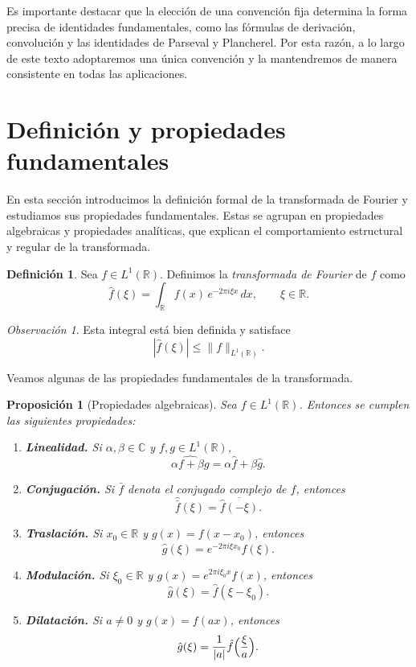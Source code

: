 \documentclass[12pt, a4paper]{amsbook}
\newcommand{\R}{{\mathbb R}}
\newcommand{\C}{{\mathbb C}}
\newtheorem{prop}[teo]{Proposición}
\theoremstyle{remark}
\newtheorem{obs}[teo]{Observación}
\theoremstyle{definition}
\newtheorem{defi}[teo]{Definición}
\numberwithin{section}{chapter}
\numberwithin{subsection}{section}
\numberwithin{equation}{section}
\numberwithin{figure}{chapter}
\begin{document}
Es importante destacar que la elección de una convención fija determina la forma precisa de identidades fundamentales, como las fórmulas de derivación, convolución y las identidades de Parseval y Plancherel. Por esta razón, a lo largo de este texto adoptaremos una única convención y la mantendremos de manera consistente en todas las aplicaciones.

\section{Definición y propiedades fundamentales}

En esta sección introducimos la definición formal de la transformada de Fourier y estudiamos sus propiedades fundamentales. Estas se agrupan en propiedades algebraicas y propiedades analíticas, que explican el comportamiento estructural y regular de la transformada.


\begin{defi}
Sea $f\in L^1(\R)$. Definimos la \emph{transformada de Fourier} de $f$ como
\[
\hat f(\xi)=\int_{\R} f(x)\,e^{-2\pi i \xi x}\,dx,
\qquad \xi\in\R.
\]
\end{defi}

\begin{obs}
Esta integral está bien definida y satisface
\[
|\hat f(\xi)|\le \|f\|_{L^1(\R)}.
\]
\end{obs}

Veamos algunas de las propiedades fundamentales de la transformada.

\begin{prop}[Propiedades algebraicas]\label{prop.algebraica}
Sea $f\in L^1(\R)$. Entonces se cumplen las siguientes propiedades:
\begin{enumerate}
\item \textbf{Linealidad.}  
Si $\alpha,\beta\in\C$ y $f,g\in L^1(\R)$,
\[
\widehat{\alpha f+\beta g}=\alpha\hat f+\beta\hat g.
\]

\item \textbf{Conjugación.}  
Si $\bar{f}$ denota el conjugado complejo de $f$, entonces
\[
\widehat{\bar{f}}(\xi)=\overline{\hat f(-\xi)}.
\]

\item \textbf{Traslación.}  
Si $x_0\in\R$ y $g(x)=f(x-x_0)$, entonces
\[
\hat g(\xi)=e^{-2\pi i \xi x_0}\hat f(\xi).
\]

\item \textbf{Modulación.}  
Si $\xi_0\in\R$ y $g(x)=e^{2\pi i \xi_0 x}f(x)$, entonces
\[
\hat g(\xi)=\hat f(\xi-\xi_0).
\]

\item \textbf{Dilatación.}  
Si $a\neq 0$ y $g(x)=f(ax)$, entonces
\[
\hat g(\xi)=\frac{1}{|a|}\hat f\Bigl(\frac{\xi}{a}\Bigr).
\]
\end{enumerate}
\end{prop}
\end{document}
